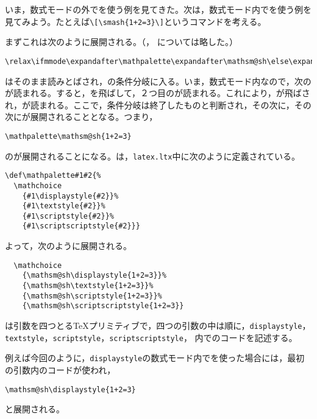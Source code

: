 \documentclass[autodetect-engine,dvipdfmx]{jsarticle}
\begin{document}
いま，数式モードの外でを使う例を見てきた。次は，数式モード内でを使う例を見てみよう。たとえば\preSub\verb|\[\smash{1+2=3}\]|\preSub というコマンドを考える。

まずこれは次のように展開される。（\cmd{[}，\cmd{]} については略した。）

\texsource
\begin{lstlisting}
\relax\ifmmode\expandafter\mathpalette\expandafter\mathsm@sh\else\expandafter\makesm@sh\fi{1+2=3}
\end{lstlisting}

はそのまま読みとばされ，の条件分岐に入る。いま，数式モード内なので，次のが読まれる。すると，を飛ばして，２つ目のが読まれる。これにより，が飛ばされ，が読まれる。ここで，条件分岐は終了したものと判断され，その次に，その次にが展開されることとなる。つまり，

\texsource
\begin{lstlisting}
\mathpalette\mathsm@sh{1+2=3}
\end{lstlisting}
のが展開されることになる。は，\texttt{latex.ltx}中に次のように定義されている。

\latexltx
\begin{lstlisting}[firstnumber=4101]
\def\mathpalette#1#2{%
  \mathchoice
    {#1\displaystyle{#2}}%
    {#1\textstyle{#2}}%
    {#1\scriptstyle{#2}}%
    {#1\scriptscriptstyle{#2}}}
\end{lstlisting}

よって，次のように展開される。

\texsource
\begin{lstlisting}
  \mathchoice
    {\mathsm@sh\displaystyle{1+2=3}}%
    {\mathsm@sh\textstyle{1+2=3}}%
    {\mathsm@sh\scriptstyle{1+2=3}}%
    {\mathsm@sh\scriptscriptstyle{1+2=3}}
\end{lstlisting}

は引数を四つとる\TeX プリミティブで，四つの引数の中は順に，\texttt{displaystyle}，\texttt{textstyle}，\texttt{scriptstyle}，\texttt{scriptscriptstyle}，
内でのコードを記述する。

例えば今回のように，\texttt{displaystyle}の数式モード内でを使った場合には，最初の引数内のコードが使われ，　

\texsource
\begin{lstlisting}
\mathsm@sh\displaystyle{1+2=3}
\end{lstlisting}
と展開される。
\end{document}
